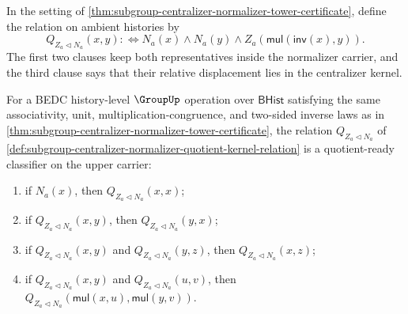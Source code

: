 \begin{definition}
\label{def:subgroup-centralizer-normalizer-quotient-kernel-relation}
In the setting of
\autoref{thm:subgroup-centralizer-normalizer-tower-certificate}, define the
relation on ambient histories by
$$
Q_{Z_a\triangleleft N_a}(x,y) :\Longleftrightarrow
N_a(x)\land N_a(y)\land
Z_a(\mathsf{mul}(\mathsf{inv}(x),y)).
$$
The first two clauses keep both representatives inside the normalizer carrier,
and the third clause says that their relative displacement lies in the
centralizer kernel.
\end{definition}

\begin{theorem}
\label{thm:subgroup-centralizer-normalizer-quotient-kernel-congruence}
For a BEDC history-level $\GroupUp$ operation over $\mathsf{BHist}$ satisfying
the same associativity, unit, multiplication-congruence, and two-sided inverse
laws as in
\autoref{thm:subgroup-centralizer-normalizer-tower-certificate}, the relation
$Q_{Z_a\triangleleft N_a}$ of
\autoref{def:subgroup-centralizer-normalizer-quotient-kernel-relation} is a
quotient-ready classifier on the upper carrier:
\begin{enumerate}
\item if $N_a(x)$, then $Q_{Z_a\triangleleft N_a}(x,x)$;
\item if $Q_{Z_a\triangleleft N_a}(x,y)$, then
$Q_{Z_a\triangleleft N_a}(y,x)$;
\item if $Q_{Z_a\triangleleft N_a}(x,y)$ and
$Q_{Z_a\triangleleft N_a}(y,z)$, then
$Q_{Z_a\triangleleft N_a}(x,z)$;
\item if $Q_{Z_a\triangleleft N_a}(x,y)$ and
$Q_{Z_a\triangleleft N_a}(u,v)$, then
$Q_{Z_a\triangleleft N_a}(\mathsf{mul}(x,u),\mathsf{mul}(y,v))$.
\end{enumerate}
\end{theorem}
